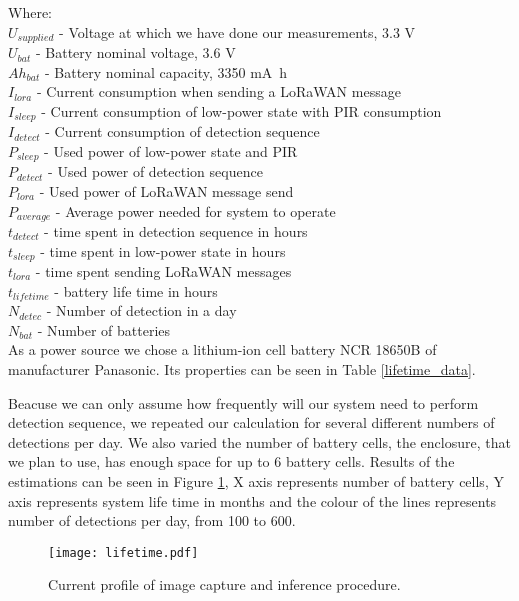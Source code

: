 Where:\\
$U_{supplied}$ - Voltage at which we have done our measurements, 3.3 V\\
$U_{bat}$ - Battery nominal voltage, 3.6 V\\
$Ah_{bat}$ - Battery nominal capacity, 3350 \si{\milli\ampere\hour}\\
$I_{lora}$ - Current consumption when sending a LoRaWAN message\\
$I_{sleep}$ - Current consumption of low-power state with PIR consumption\\
$I_{detect}$ - Current consumption of detection sequence\\
$P_{sleep}$ - Used power of low-power state and PIR\\
$P_{detect}$ - Used power of detection sequence\\
$P_{lora}$ - Used power of LoRaWAN message send\\
$P_{average}$ - Average power needed for system to operate\\
$t_{detect}$ - time spent in detection sequence in hours\\
$t_{sleep}$ - time spent in low-power state in hours\\
$t_{lora}$  - time spent sending LoRaWAN messages\\
$t_{lifetime}$ - battery life time in hours\\
$N_{detec}$ - Number of detection in a day\\
$N_{bat}$ - Number of batteries\\

As a power source we chose a lithium-ion cell battery NCR 18650B of manufacturer Panasonic.
Its properties can be seen in Table \ref{lifetime_data}.

Beacuse we can only assume how frequently will our system need to perform detection sequence, we repeated our calculation for several different numbers of detections per day.
We also varied the number of battery cells, the enclosure, that we plan to use, has enough space for up to 6 battery cells.
Results of the estimations can be seen in Figure \ref{lifetime_figure}, X axis represents number of battery cells, Y axis represents system life time in months and the colour of the lines represents number of detections per day, from 100 to 600.

\begin{figure}[ht]
    \centering
    \texttt{[image: lifetime.pdf]}
    \caption{ Current profile of image capture and inference procedure.}
    \label{lifetime_figure}
\end{figure}


